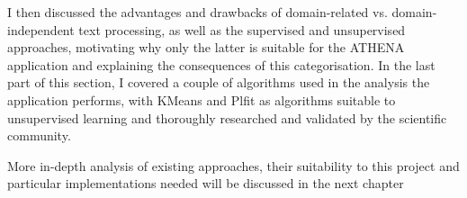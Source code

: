 I then discussed the advantages and drawbacks of domain-related vs. domain-independent text processing, as well as the supervised and unsupervised approaches, motivating why only the latter is suitable for the ATHENA application and explaining the consequences of this categorisation. In the last part of this section, I covered a couple of algorithms used in the analysis the application performs, with KMeans and Plfit as algorithms suitable to unsupervised learning and thoroughly researched and validated by the scientific community.

More in-depth analysis of existing approaches, their suitability to this project and particular implementations needed will be discussed in the next chapter